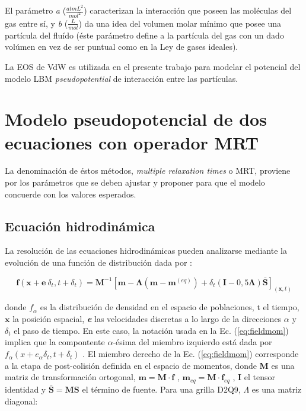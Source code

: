 El parámetro \textit{a}  ($\frac{atm L^2}{mol^2}$) caracterizan la interacción que poseen las moléculas del gas entre sí, y \textit{b} ($\frac{L}{mol}$) da una idea del volumen molar mínimo que posee una partícula del fluído (éste parámetro define a la partícula del gas con un dado volúmen en vez de ser puntual como en la Ley de gases ideales).

La EOS de VdW es utilizada en el presente trabajo para modelar el potencial del modelo LBM \textit{pseudopotential} de interacción entre las partículas.


\section{Modelo pseudopotencial de dos ecuaciones con operador MRT}

La denominación de éstos métodos, \textit{multiple relaxation times} o MRT, proviene por los parámetros que se deben ajustar y proponer para que el modelo concuerde con los valores esperados.

\subsection{Ecuación hidrodinámica}


La resolución de las ecuaciones hidrodinámicas pueden analizarse mediante la evolución de una función de distribución dada por \cite{li2013lattice}: 	

\begin{equation}
    \mathbf{f}(\mathbf{x} + \mathbf{e} \> \delta_{t} , t + \delta_{t}) = \mathbf{M}^{-1} \left[ \mathbf{m} - \mathbf{\Lambda}(\mathbf{m} - \mathbf{m}^{(eq)}) + \delta_{t} \left( \mathbf{I} - 0,5 \mathbf{\Lambda} \right) \mathbf{\bar{S}}  \right]_{(\mathbf{x},t)} 
    \label{eq:fieldmom}
\end{equation}

donde $\textit{f}_{\alpha}$ es la distribución de densidad en el espacio de poblaciones, t el tiempo, $\mathbf{x}$ la posición espacial, \textit{\textbf{e}} las velocidades discretas a lo largo de la direcciones $\alpha$ y $\delta_{t}$ el paso de tiempo. En este caso, la notación usada en la Ec. (\ref{eq:fieldmom}) implica que la compontente $\alpha$-ésima del miembro izquierdo está dada por $f_{\alpha}(x + e_{\alpha} \delta_{t}  , t + \delta_{t} )$ . El miembro derecho de la Ec. (\ref{eq:fieldmom}) corresponde a la etapa de post-colisión definida en el espacio de momentos, donde \textbf{M} es una matriz de transformación ortogonal, $\mathbf{m} = \mathbf{M} \cdot \mathbf{f}$ , $\mathbf{m}_{eq} = \mathbf{M} \cdot \mathbf{f}_{eq}$ , \textbf{I} el tensor identidad y $\mathbf{\bar{S}} = \mathbf{M} \mathbf{S}$ el término de fuente. Para una grilla D2Q9, $ \Lambda$ es una matriz diagonal:
    
